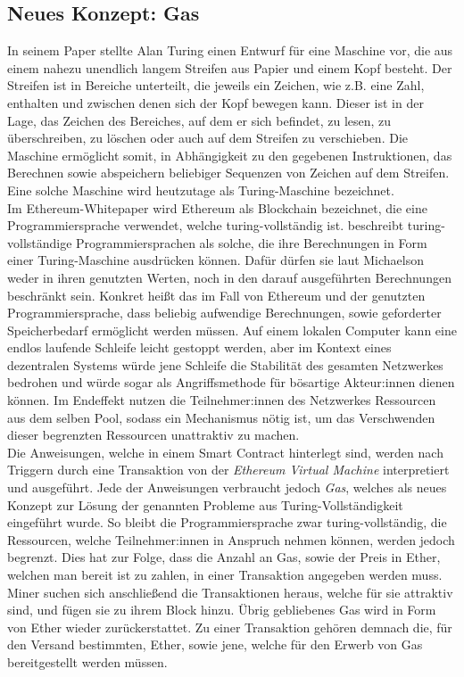 \subsection{Neues Konzept: Gas}
In seinem Paper \cite{turing_1936} stellte Alan Turing einen Entwurf für eine Maschine vor, die aus einem nahezu unendlich langem Streifen aus Papier und einem Kopf besteht. Der Streifen ist in Bereiche unterteilt, die jeweils ein Zeichen, wie z.B. eine Zahl, enthalten und zwischen denen sich der Kopf bewegen kann. Dieser ist in der Lage, das Zeichen des Bereiches, auf dem er sich befindet, zu lesen, zu überschreiben, zu löschen oder auch auf dem Streifen zu verschieben. Die Maschine ermöglicht somit, in Abhängigkeit zu den gegebenen Instruktionen, das Berechnen sowie abspeichern beliebiger Sequenzen von Zeichen auf dem Streifen. Eine solche Maschine wird heutzutage als Turing-Maschine bezeichnet.\\

Im Ethereum-Whitepaper \cite{buterin_whitepaper_2013} wird Ethereum als Blockchain bezeichnet, die eine Programmiersprache verwendet, welche turing-vollständig ist. \cite{Michaelson_2020} beschreibt turing-vollständige Programmiersprachen als solche, die ihre Berechnungen in Form einer Turing-Maschine ausdrücken können. Dafür dürfen sie laut Michaelson weder in ihren genutzten Werten, noch in den darauf ausgeführten Berechnungen beschränkt sein. Konkret heißt das im Fall von Ethereum und der genutzten Programmiersprache, dass beliebig aufwendige Berechnungen, sowie geforderter Speicherbedarf ermöglicht werden müssen.
Auf einem lokalen Computer kann eine endlos laufende Schleife leicht gestoppt werden, aber im Kontext eines dezentralen Systems würde jene Schleife die Stabilität des gesamten Netzwerkes bedrohen und würde sogar als Angriffsmethode für bösartige Akteur:innen dienen können. Im Endeffekt nutzen die Teilnehmer:innen des Netzwerkes Ressourcen aus dem selben Pool, sodass ein Mechanismus nötig ist, um das Verschwenden dieser begrenzten Ressourcen unattraktiv zu machen.\\

Die Anweisungen, welche in einem Smart Contract hinterlegt sind, werden nach Triggern durch eine Transaktion von der \emph{Ethereum Virtual Machine} interpretiert und ausgeführt. Jede der Anweisungen verbraucht jedoch \emph{Gas}, welches als neues Konzept zur Lösung der genannten Probleme aus Turing-Vollständigkeit eingeführt wurde. So bleibt die Programmiersprache zwar turing-vollständig, die Ressourcen, welche Teilnehmer:innen in Anspruch nehmen können, werden jedoch begrenzt. Dies hat zur Folge, dass die Anzahl an Gas, sowie der Preis in Ether, welchen man bereit ist zu zahlen, in einer Transaktion angegeben werden muss. Miner suchen sich anschließend die Transaktionen heraus, welche für sie attraktiv sind, und fügen sie zu ihrem Block hinzu. Übrig gebliebenes Gas wird in Form von Ether wieder zurückerstattet. Zu einer Transaktion gehören demnach die, für den Versand bestimmten, Ether, sowie jene, welche für den Erwerb von Gas bereitgestellt werden müssen.
